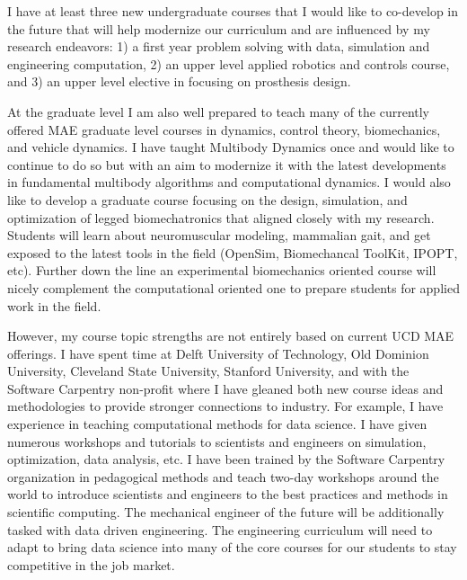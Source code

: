 \documentclass{article}
\begin{document}
I have at least three new undergraduate courses that I would like to co-develop
in the future that will help modernize our curriculum and are influenced by my
research endeavors: 1) a first year problem solving with data, simulation and
engineering computation, 2) an upper level applied robotics and controls
course, and 3) an upper level elective in focusing on prosthesis design.

At the graduate level I am also well prepared to teach many of the currently
offered MAE graduate level courses in dynamics, control theory, biomechanics,
and vehicle dynamics. I have taught Multibody Dynamics once and would like to
continue to do so but with an aim to modernize it with the latest developments
in fundamental multibody algorithms and computational dynamics. I would also
like to develop a graduate course focusing on the design, simulation, and
optimization of legged biomechatronics that aligned closely with my research.
Students will learn about neuromuscular modeling, mammalian gait, and get
exposed to the latest tools in the field (OpenSim, Biomechancal ToolKit, IPOPT,
etc). Further down the line an experimental biomechanics oriented course will
nicely complement the computational oriented one to prepare students for
applied work in the field.

However, my course topic strengths are not entirely based on current UCD MAE
offerings. I have spent time at Delft University of Technology, Old Dominion
University, Cleveland State University, Stanford University, and with the
Software Carpentry non-profit where I have gleaned both new course ideas and
methodologies to provide stronger connections to industry. For example, I have
experience in teaching computational methods for data science. I have given
numerous workshops and tutorials to scientists and engineers on simulation,
optimization, data analysis, etc. I have been trained by the Software Carpentry
organization in pedagogical methods and teach two-day workshops around the
world to introduce scientists and engineers to the best practices and methods
in scientific computing. The mechanical engineer of the future will be
additionally tasked with data driven engineering. The engineering curriculum
will need to adapt to bring data science into many of the core courses for our
students to stay competitive in the job market.
\end{document}
